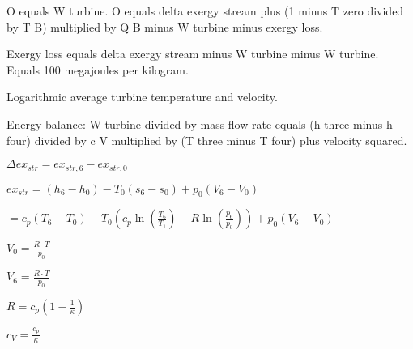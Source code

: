 O equals W turbine.  
O equals delta exergy stream plus (1 minus T zero divided by T B) multiplied by Q B minus W turbine minus exergy loss.  

Exergy loss equals delta exergy stream minus W turbine minus W turbine.  
Equals 100 megajoules per kilogram.  

Logarithmic average turbine temperature and velocity.  

Energy balance:  
W turbine divided by mass flow rate equals (h three minus h four) divided by c V multiplied by (T three minus T four) plus velocity squared.

\( \Delta ex_{str} = ex_{str,6} - ex_{str,0} \)

\( ex_{str} = (h_6 - h_0) - T_0 (s_6 - s_0) + p_0 \left( V_6 - V_0 \right) \)

\( = c_p (T_6 - T_0) - T_0 \left( c_p \ln \left( \frac{T_6}{T_1} \right) - R \ln \left( \frac{p_6}{p_0} \right) \right) + p_0 \left( V_6 - V_0 \right) \)

\( V_0 = \frac{R \cdot T}{p_0} \)

\( V_6 = \frac{R \cdot T}{p_0} \)

\( R = c_p \left( 1 - \frac{1}{\kappa} \right) \)

\( c_V = \frac{c_p}{\kappa} \)